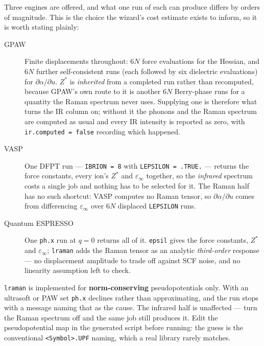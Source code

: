 Three engines are offered, and what one run of each can produce differs by
orders of magnitude. This is the choice the wizard's cost estimate exists to
inform, so it is worth stating plainly:

\begin{description}
  \item[GPAW] Finite displacements throughout: $6N$ force evaluations for the
    Hessian, and $6N$ further self-consistent runs (each followed by six
    dielectric evaluations) for $\partial\alpha/\partial u$. $Z^*$ is
    \emph{inherited} from a completed  run rather
    than recomputed, because GPAW's own route to it is another $6N$ Berry-phase
    runs for a quantity the Raman spectrum never uses. Supplying one is
    therefore what turns the IR column on; without it the phonons and the Raman
    spectrum are computed as usual and every IR intensity is reported as zero,
    with \texttt{ir.computed = false} recording which happened.
  \item[VASP] One DFPT run --- \texttt{IBRION = 8} with
    \texttt{LEPSILON = .TRUE.} --- returns the force constants, every ion's
    $Z^*$ and $\varepsilon_\infty$ together, so the \emph{infrared} spectrum
    costs a single job and nothing has to be selected for it. The Raman half
    has no such shortcut: VASP computes no Raman tensor, so
    $\partial\alpha/\partial u$ comes from differencing
    $\varepsilon_\infty$ over $6N$ displaced \texttt{LEPSILON} runs.
  \item[Quantum ESPRESSO] One \texttt{ph.x} run at $q = 0$ returns all of it.
    \texttt{epsil} gives the force constants, $Z^*$ and $\varepsilon_\infty$;
    \texttt{lraman} adds the Raman tensor as an analytic \emph{third-order}
    response --- no displacement amplitude to trade off against SCF noise, and
    no linearity assumption left to check.
\end{description}

\begin{calwarn}
\texttt{lraman} is implemented for \textbf{norm-conserving} pseudopotentials
only. With an ultrasoft or PAW set \texttt{ph.x} declines rather than
approximating, and the run stops with a message naming that as the cause. The
infrared half is unaffected --- turn the Raman spectrum off and the same job
still produces it. Edit the pseudopotential map in the generated script before
running: the guess is the conventional \texttt{<Symbol>.UPF} naming, which a
real library rarely matches.
\end{calwarn}

